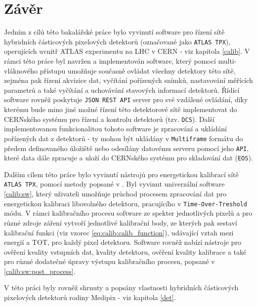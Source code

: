 

\chapter{Závěr}
Jedním z cílů této bakalářské práce bylo vyvinutí software pro řízení sítě hybridních částicových pixelových detektorů (označované jako \texttt{ATLAS TPX}), operujících uvnitř ATLAS experimentu na LHC v CERN - viz kapitola \ref{calib}. V rámci této práce byl navržen a implementován software, který pomocí multi-vláknového přístupu umožňuje současně ovládat všechny detektory této sítě, zejména pak řízení akvizice dat, vyčítání pořízených snímků, nastavování měřících parametrů a také vyčítání a uchovávání stavových informací detektorů. Řídící software rovněž poskytuje \texttt{JSON REST API} server pro své vzdálené ovládání, díky kterému bude mino jiné možné řízení této detektorové sítě implementovat do CERNského systému pro řízení a kontrolu detektorů (tzv. \texttt{DCS}). Další implementovanou funkcionalitou tohoto software je zpracování a ukládání pořízených dat z detektorů - ty mohou být ukládány v \texttt{Multiframe} formátu do předem definovaného úložiště nebo odesílány datovému serveru pomocí jeho \texttt{API}, které data dále zpracuje a uloží do CERNského systému pro skladování dat (\texttt{EOS}).

Dalším cílem této práce bylo vyvinutí nástrojů pro energetickou kalibrací sítě \texttt{ATLAS TPX}, pomocí metody popsané v \cite{Jakubek2011S262}. Byl vyvinut univerzální software \ref{calib:sw}, který uživateli umožňuje průchod procesem zpracování dat pro energetickou kalibraci libovolného detektoru, pracujícího v \texttt{Time-Over-Treshold} módu. V rámci kalibračního procesu software ze spekter jednotlivých pixelů a pro různé zdroje záření vytvoří jednotlivé kalibrační body, ze kterých pak sestaví kalibrační funkci (viz vzorec \ref{eq:calib:calib_function}), udávající vztah mezi energií a TOT, pro každý pixel detektoru. Software rovněž nabízí nástroje pro ověření kvality vstupních dat, kvality detektoru, ověření kvality kalibrace a také pro různé dodatečné úpravy výstupu kalibračního procesu, popsané v \ref{calib:sw:post_process}.

V této práci byly rovněž shrnuty a popsány vlastnosti hybridních částicových pixelových detektorů rodiny Medipix - viz kapitola \ref{det}.